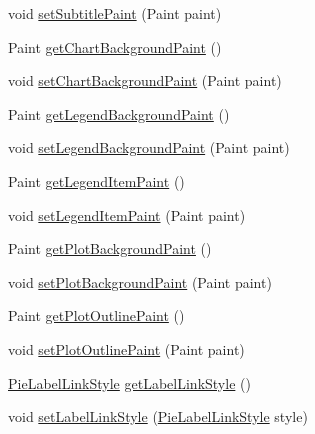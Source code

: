 \begin{DoxyCompactItemize}
\item 
void \mbox{\hyperlink{classorg_1_1jfree_1_1chart_1_1_standard_chart_theme_afd19c18a9662dbcea79896ccea56bc74}{set\+Subtitle\+Paint}} (Paint paint)
\item 
Paint \mbox{\hyperlink{classorg_1_1jfree_1_1chart_1_1_standard_chart_theme_a282a85722cb384c3a745c15e6ef5cf02}{get\+Chart\+Background\+Paint}} ()
\item 
void \mbox{\hyperlink{classorg_1_1jfree_1_1chart_1_1_standard_chart_theme_ad3c8891779ca58e4e3d22a9a2a5f84fa}{set\+Chart\+Background\+Paint}} (Paint paint)
\item 
Paint \mbox{\hyperlink{classorg_1_1jfree_1_1chart_1_1_standard_chart_theme_a5288003c0d9a02190cea19ae79b510c0}{get\+Legend\+Background\+Paint}} ()
\item 
void \mbox{\hyperlink{classorg_1_1jfree_1_1chart_1_1_standard_chart_theme_ada53066c7505682778d0bc8ed4fdab66}{set\+Legend\+Background\+Paint}} (Paint paint)
\item 
Paint \mbox{\hyperlink{classorg_1_1jfree_1_1chart_1_1_standard_chart_theme_a892baea00955745f630d087e079add9e}{get\+Legend\+Item\+Paint}} ()
\item 
void \mbox{\hyperlink{classorg_1_1jfree_1_1chart_1_1_standard_chart_theme_aad77d72f359f37a618c34d0f404b00fa}{set\+Legend\+Item\+Paint}} (Paint paint)
\item 
Paint \mbox{\hyperlink{classorg_1_1jfree_1_1chart_1_1_standard_chart_theme_a2aa18220fcadb8ebd8f099644ea2ef2d}{get\+Plot\+Background\+Paint}} ()
\item 
void \mbox{\hyperlink{classorg_1_1jfree_1_1chart_1_1_standard_chart_theme_a828da90a85a9f3cc3b592e0d588d8eb3}{set\+Plot\+Background\+Paint}} (Paint paint)
\item 
Paint \mbox{\hyperlink{classorg_1_1jfree_1_1chart_1_1_standard_chart_theme_a86705dd536633d55d7451feb16e589ee}{get\+Plot\+Outline\+Paint}} ()
\item 
void \mbox{\hyperlink{classorg_1_1jfree_1_1chart_1_1_standard_chart_theme_abb2cb7117ac0684e201aa370e1589332}{set\+Plot\+Outline\+Paint}} (Paint paint)
\item 
\mbox{\hyperlink{classorg_1_1jfree_1_1chart_1_1plot_1_1_pie_label_link_style}{Pie\+Label\+Link\+Style}} \mbox{\hyperlink{classorg_1_1jfree_1_1chart_1_1_standard_chart_theme_ad9307f3123c0bb7f50910dce759ddcf4}{get\+Label\+Link\+Style}} ()
\item 
void \mbox{\hyperlink{classorg_1_1jfree_1_1chart_1_1_standard_chart_theme_aec49f0c54df7d3c6a9b6e3efc2a01b6a}{set\+Label\+Link\+Style}} (\mbox{\hyperlink{classorg_1_1jfree_1_1chart_1_1plot_1_1_pie_label_link_style}{Pie\+Label\+Link\+Style}} style)

\end{DoxyCompactItemize}

